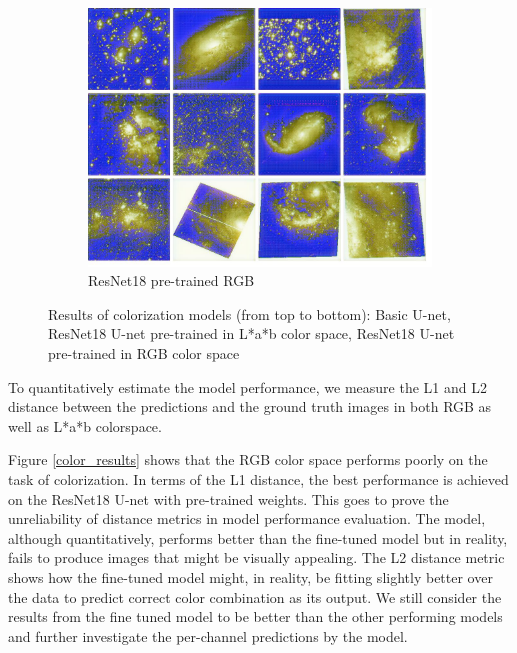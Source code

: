 \documentclass[conference]{IEEEtran}
\begin{document}
\begin{figure}[!htb]
	\begin{subfigure}[b]{0.25\textwidth}
		\centering
		\includegraphics[width=\textwidth]{figures/samples_coco}
		\caption{ResNet18 pre-trained RGB}
		\label{fig: resnet18_rgb}
	\end{subfigure}
	\caption{Results of colorization models (from top to bottom): Basic U-net, ResNet18 U-net pre-trained in L*a*b color space, ResNet18 U-net pre-trained in RGB color space}
	\label{fig: comparisons}
\end{figure}

To quantitatively estimate the model performance, we measure the L1 and L2 distance between the predictions and the ground truth images in both RGB as well as L*a*b colorspace. 



Figure \ref{color_results} shows that the RGB color space performs poorly on the task of colorization. In terms of the L1 distance, the best performance is achieved on the ResNet18 U-net with pre-trained weights. This goes to prove the unreliability of distance metrics in model performance evaluation. The model, although quantitatively, performs better than the fine-tuned model but in reality, fails to produce images that might be visually appealing. The L2 distance metric shows how the fine-tuned model might, in reality, be fitting slightly better over the data to predict correct color combination as its output. We still consider the results from the fine tuned model to be better than the other performing models and further investigate the per-channel predictions by the model.
\end{document}
